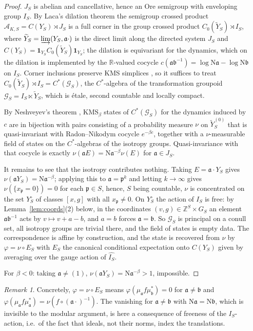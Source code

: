 \documentclass[11pt]{amsart}
\numberwithin{equation}{section}
\theoremstyle{definition}
\theoremstyle{remark}
\newtheorem{remark}[theorem]{Remark}
\newcommand{\Z}{\mathbb{Z}}
\newcommand{\R}{\mathbb{R}}
\newcommand{\Ns}{\mathrm{N}}
\newcommand{\cA}{\mathcal{A}}
\newcommand{\cG}{\mathcal{G}}
\newcommand{\pp}{\mathfrak{p}}
\newcommand{\aaa}{\mathfrak{a}}
\newcommand{\bb}{\mathfrak{b}}
\begin{document}
\begin{proof}
$J_S$ is abelian and cancellative, hence an Ore semigroup with enveloping group
$I_S$. By Laca's dilation theorem \cite{Laca} the semigroup crossed product
$\cA_{K,S}=C(Y_S)\rtimes J_S$ is a full corner in the group crossed product
$C_0(\widetilde Y_S)\rtimes I_S$, where
$\widetilde Y_S=\varinjlim(Y_S,\aaa\cdot)$ is the direct limit along the
directed system $J_S$ and $C(Y_S)=\mathbf 1_{Y_S}C_0(\widetilde Y_S)\mathbf 1_{Y_S}$;
the dilation is equivariant for the dynamics, which on the dilation is
implemented by the $\R$-valued cocycle $c(\aaa\bb^{-1})=\log\Ns\aaa-\log\Ns\bb$
on $I_S$. Corner inclusions preserve KMS simplices \cite[\S3]{Laca}, so it
suffices to treat $C_0(\widetilde Y_S)\rtimes I_S=C^*(\cG_S)$, the $C^*$-algebra
of the transformation groupoid $\cG_S=I_S\ltimes\widetilde Y_S$, which is
étale, second countable and locally compact.

By Neshveyev's theorem \cite[Thm.~1.3]{Nesh13}, $\mathrm{KMS}_\beta$ states of
$C^*(\cG_S)$ for the dynamics induced by $c$ are in bijection with pairs
consisting of a probability measure $\nu$ on $\widetilde Y_S^{(0)}$ that is
quasi-invariant with Radon--Nikodym cocycle $e^{-\beta c}$, together with a
$\nu$-measurable field of states on the $C^*$-algebras of the isotropy groups.
Quasi-invariance with that cocycle is exactly
$\nu(\aaa E)=\Ns\aaa^{-\beta}\nu(E)$ for $\aaa\in J_S$.

It remains to see that the isotropy contributes nothing. Taking
$E=\aaa\cdot Y_S$ gives $\nu(\aaa Y_S)=\Ns\aaa^{-\beta}$; applying this to
$\aaa=\pp^k$ and letting $k\to\infty$ gives $\nu(\{x_\pp=0\})=0$ for each
$\pp\in S$, hence, $S$ being countable, $\nu$ is concentrated on the set
$Y_S^\circ$ of classes $[x,g]$ with all $x_\pp\neq0$. On $Y_S^\circ$ the action
of $I_S$ is free: by Lemma~\ref{lem:coords}(2) below, in the coordinates
$(v,g)\in\Z^S\times G_S$ an element $\aaa\bb^{-1}$ acts by
$v\mapsto v+a-b$, and $a=b$ forces $\aaa=\bb$. So $\cG_S$ is principal on a
conull set, all isotropy groups are trivial there, and the field of states is
empty data. The correspondence is affine by construction, and the state is
recovered from $\nu$ by $\varphi=\nu\circ E_S$ with $E_S$ the canonical
conditional expectation onto $C(Y_S)$ given by averaging over the gauge action
of $\widehat{I_S}$.

For $\beta<0$: taking $\aaa\neq(1)$, $\nu(\aaa Y_S)=\Ns\aaa^{-\beta}>1$,
impossible.
\end{proof}

\begin{remark}
Concretely, $\varphi=\nu\circ E_S$ means $\varphi(\mu_\aaa f\mu_\bb^*)=0$ for
$\aaa\neq\bb$ and $\varphi(\mu_\aaa f\mu_\aaa^*)=\nu(f\circ(\aaa\cdot)^{-1})$.
The vanishing for $\aaa\neq\bb$ with $\Ns\aaa=\Ns\bb$, which is invisible to the
modular argument, is here a consequence of freeness of the $I_S$-action, i.e.\
of the fact that ideals, not their norms, index the translations.
\end{remark}
\end{document}
